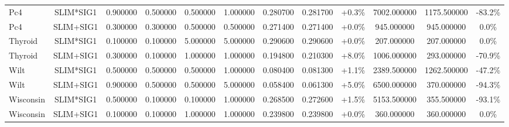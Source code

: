 \begin{table}[H]
\begin{tabular}{lccccccccccc}
Pc4 & SLIM*SIG1 & 0.900000 & 0.500000 & 0.500000 & 1.000000 & 0.280700 & 0.281700 & +0.3\% & 7002.000000 & 1175.500000 & -83.2\% \\
Pc4 & SLIM+SIG1 & 0.300000 & 0.300000 & 0.500000 & 0.500000 & 0.271400 & 0.271400 & +0.0\% & 945.000000 & 945.000000 & 0.0\% \\
Thyroid & SLIM*SIG1 & 0.100000 & 0.100000 & 5.000000 & 5.000000 & 0.290600 & 0.290600 & +0.0\% & 207.000000 & 207.000000 & 0.0\% \\
Thyroid & SLIM+SIG1 & 0.300000 & 0.100000 & 1.000000 & 1.000000 & 0.194800 & 0.210300 & +8.0\% & 1006.000000 & 293.000000 & -70.9\% \\
Wilt & SLIM*SIG1 & 0.500000 & 0.500000 & 0.500000 & 1.000000 & 0.080400 & 0.081300 & +1.1\% & 2389.500000 & 1262.500000 & -47.2\% \\
Wilt & SLIM+SIG1 & 0.900000 & 0.500000 & 0.500000 & 5.000000 & 0.058400 & 0.061300 & +5.0\% & 6500.000000 & 370.000000 & -94.3\% \\
Wisconsin & SLIM*SIG1 & 0.500000 & 0.100000 & 0.100000 & 1.000000 & 0.268500 & 0.272600 & +1.5\% & 5153.500000 & 355.500000 & -93.1\% \\
Wisconsin & SLIM+SIG1 & 0.100000 & 0.100000 & 1.000000 & 1.000000 & 0.239800 & 0.239800 & +0.0\% & 360.000000 & 360.000000 & 0.0\% \\
\bottomrule
\end{tabular}

        
    \end{table}
    